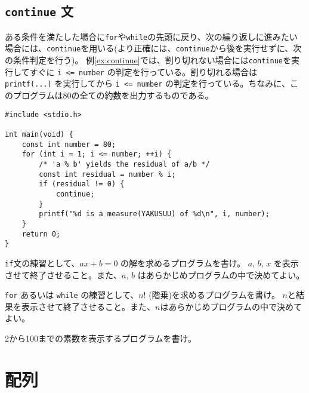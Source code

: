 \subsection{\texttt{continue} 文}
ある条件を満たした場合に\texttt{for}や\texttt{while}の先頭に戻り、次の繰り返しに進みたい場合には、\texttt{continue}を用いる(より正確には、\texttt{continue}から後を実行せずに、次の条件判定を行う)。 例\ref{ex:continue}では、割り切れない場合には\texttt{continue}を実行してすぐに \texttt{i <= number} の判定を行っている。割り切れる場合は \texttt{printf(...)} を実行してから \texttt{i <= number} の判定を行っている。ちなみに、このプログラムは80の全ての約数を出力するものである。
\begin{reidai}\label{ex:continue}
    \begin{verbatim}
#include <stdio.h>

int main(void) {
    const int number = 80;
    for (int i = 1; i <= number; ++i) {
        /* 'a % b' yields the residual of a/b */
        const int residual = number % i;
        if (residual != 0) {
            continue;
        }
        printf("%d is a measure(YAKUSUU) of %d\n", i, number);
    }
    return 0;
}
\end{verbatim}
\end{reidai}
\begin{renshuu}\label{prob:2-1}
    \texttt{if}文の練習として、\(ax+b=0\) の解を求めるプログラムを書け。
    \(a\), \(b\), \(x\) を表示させて終了させること。また、\(a\), \(b\) はあらかじめプログラムの中で決めてよい。
\end{renshuu}

\begin{renshuu}\label{prob:2-2}
    \texttt{for} あるいは \texttt{while} の練習として、\(n!\) (階乗)を求めるプログラムを書け。
    \(n\)と結果を表示させて終了させること。また、\(n\)はあらかじめプログラムの中で決めてよい。
\end{renshuu}

\begin{renshuu}\label{prob:2-3}
    2から100までの素数を表示するプログラムを書け。
\end{renshuu}

\section{配列}

